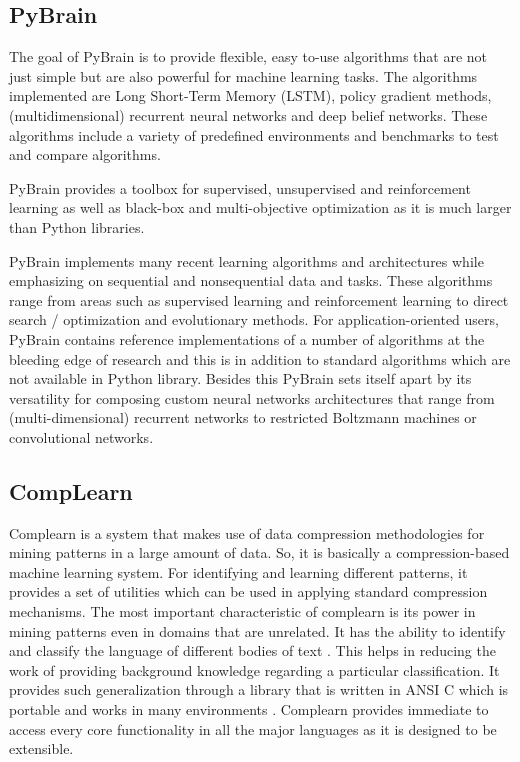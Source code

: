 \subsection{PyBrain}

  The goal of PyBrain \cite{article-pybrain} is to provide flexible,
  easy to-use algorithms that are not just simple but are also powerful
  for machine learning tasks. The algorithms implemented are Long
  Short-Term Memory (LSTM), policy gradient methods, (multidimensional)
  recurrent neural networks and deep belief networks. These algorithms
  include a variety of predefined environments and benchmarks to test
  and compare algorithms.

    PyBrain provides a toolbox for supervised, unsupervised and
    reinforcement learning as well as black-box and multi-objective
    optimization as it is much larger than Python libraries.

    PyBrain implements many recent learning algorithms and
    architectures while emphasizing on sequential and nonsequential
    data and tasks. These algorithms range from areas such as
    supervised learning and reinforcement learning to direct search /
    optimization and evolutionary methods.  For application-oriented
    users, PyBrain contains reference implementations of a number of
    algorithms at the bleeding edge of research and this is in
    addition to standard algorithms which are not available in Python
    library. Besides this PyBrain sets itself apart by its versatility
    for composing custom neural networks architectures that range from
    (multi-dimensional) recurrent networks to restricted Boltzmann
    machines or convolutional networks.
    
\subsection{CompLearn}

    Complearn is a system that makes use of data compression
    methodologies for mining patterns in a large amount of data. So,
    it is basically a compression-based machine learning system. For
    identifying and learning different patterns, it provides a set of
    utilities which can be used in applying standard compression
    mechanisms. The most important characteristic of complearn is its
    power in mining patterns even in domains that are unrelated. It
    has the ability to identify and classify the language of different
    bodies of text \cite{comp1}. This helps in reducing the work of
    providing background knowledge regarding a particular
    classification. It provides such generalization through a library
    that is written in ANSI C which is portable and works in many
    environments \cite{comp1}. Complearn provides immediate to access
    every core functionality in all the major languages as it is
    designed to be extensible.


